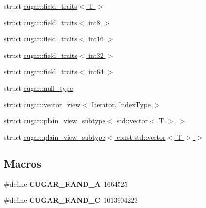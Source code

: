 \begin{DoxyCompactItemize}
struct \hyperlink{structcugar_1_1field__traits}{cugar\+::field\+\_\+traits$<$ T $>$}
\item 
struct \hyperlink{structcugar_1_1field__traits_3_01int8_01_4}{cugar\+::field\+\_\+traits$<$ int8 $>$}
\item 
struct \hyperlink{structcugar_1_1field__traits_3_01int16_01_4}{cugar\+::field\+\_\+traits$<$ int16 $>$}
\item 
struct \hyperlink{structcugar_1_1field__traits_3_01int32_01_4}{cugar\+::field\+\_\+traits$<$ int32 $>$}
\item 
struct \hyperlink{structcugar_1_1field__traits_3_01int64_01_4}{cugar\+::field\+\_\+traits$<$ int64 $>$}
\item 
struct \hyperlink{structcugar_1_1null__type}{cugar\+::null\+\_\+type}
\item 
struct \hyperlink{structcugar_1_1vector__view}{cugar\+::vector\+\_\+view$<$ Iterator, Index\+Type $>$}
\item 
struct \hyperlink{structcugar_1_1plain__view__subtype_3_01std_1_1vector_3_01_t_01_4_01_4}{cugar\+::plain\+\_\+view\+\_\+subtype$<$ std\+::vector$<$ T $>$ $>$}
\item 
struct \hyperlink{structcugar_1_1plain__view__subtype_3_01const_01std_1_1vector_3_01_t_01_4_01_4}{cugar\+::plain\+\_\+view\+\_\+subtype$<$ const std\+::vector$<$ T $>$ $>$}
\end{DoxyCompactItemize}
\subsection*{Macros}
\begin{DoxyCompactItemize}
\item 
\mbox{\label{group___basic_ga7a3c744b1fe31105beec0fbcb743606d}} 
\#define {\bfseries C\+U\+G\+A\+R\+\_\+\+R\+A\+N\+D\+\_\+A}~1664525
\item 
\mbox{\label{group___basic_ga44c94273d605b77ea3310d4aa8b78b94}} 
\#define {\bfseries C\+U\+G\+A\+R\+\_\+\+R\+A\+N\+D\+\_\+C}~1013904223
\end{DoxyCompactItemize}
